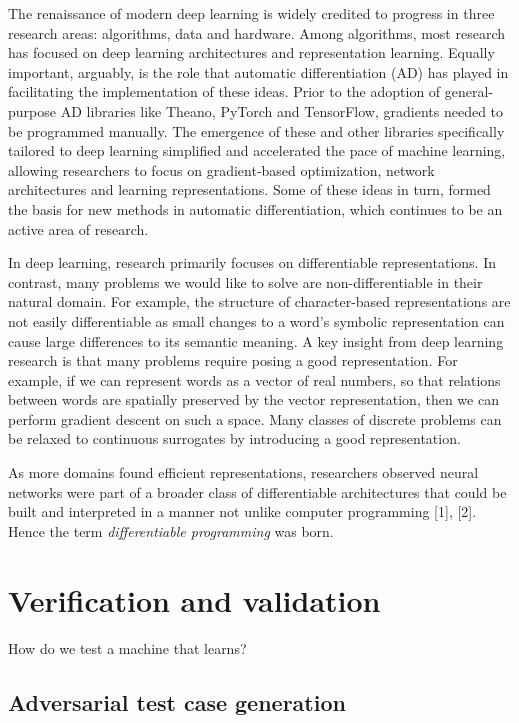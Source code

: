 \documentclass[12pt,initial,twoside,maitrise]{dms}
\numberwithin{equation}{section}
\numberwithin{table}{chapter}
\numberwithin{figure}{chapter}
\begin{document}
The renaissance of modern deep learning is widely credited to progress in three research areas: algorithms, data and hardware. Among algorithms, most research has focused on deep learning architectures and representation learning. Equally important, arguably, is the role that automatic differentiation (AD) has played in facilitating the implementation of these ideas. Prior to the adoption of general-purpose AD libraries like Theano, PyTorch and TensorFlow, gradients needed to be programmed manually. The emergence of these and other libraries specifically tailored to deep learning simplified and accelerated the pace of machine learning, allowing researchers to focus on gradient-based optimization, network architectures and learning representations. Some of these ideas in turn, formed the basis for new methods in automatic differentiation, which continues to be an active area of research.

In deep learning, research primarily focuses on differentiable representations. In contrast, many problems we would like to solve are non-differentiable in their natural domain. For example, the structure of character-based representations are not easily differentiable as small changes to a word's symbolic representation can cause large differences to its semantic meaning. A key insight from deep learning research is that many problems require posing a good representation. For example, if we can represent words as a vector of real numbers, so that relations between words are spatially preserved by the vector representation, then we can perform gradient descent on such a space. Many classes of discrete problems can be relaxed to continuous surrogates by introducing a good representation.

As more domains found efficient representations, researchers observed neural networks were part of a broader class of differentiable architectures that could be built and interpreted in a manner not unlike computer programming [1], [2]. Hence the term \textit{differentiable programming} was born.

\chapter{Verification and validation}\label{ch:difftest}

How do we test a machine that learns?

\section{Adversarial test case generation}
\end{document}
